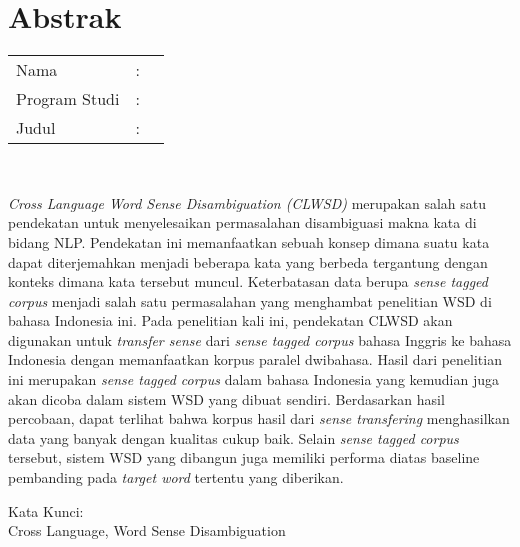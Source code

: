 %
%
%

\chapter*{Abstrak}

\vspace*{0.2cm}

\noindent \begin{tabular}{l l p{10cm}}
	Nama&: & \penulis \\
	Program Studi&: & \program \\
	Judul&: & \judul \\
\end{tabular} \\ 

\vspace*{0.5cm}

\noindent
\textit{Cross Language Word Sense Disambiguation (CLWSD)} merupakan salah satu pendekatan untuk menyelesaikan permasalahan disambiguasi makna kata di bidang NLP. Pendekatan ini memanfaatkan sebuah konsep dimana suatu kata dapat diterjemahkan menjadi beberapa kata yang berbeda tergantung dengan konteks dimana kata tersebut muncul. Keterbatasan data berupa \textit{sense tagged corpus} menjadi salah satu permasalahan yang menghambat penelitian WSD di bahasa Indonesia ini. Pada penelitian kali ini, pendekatan CLWSD akan digunakan untuk \textit{transfer sense} dari \textit{sense tagged corpus} bahasa Inggris ke bahasa Indonesia dengan memanfaatkan korpus paralel dwibahasa. Hasil dari penelitian ini merupakan \textit{sense tagged corpus} dalam bahasa Indonesia yang kemudian juga akan dicoba dalam sistem WSD yang dibuat sendiri. Berdasarkan hasil percobaan, dapat terlihat bahwa korpus hasil dari \textit{sense transfering} menghasilkan data yang banyak dengan kualitas cukup baik. Selain \textit{sense tagged corpus} tersebut, sistem WSD yang dibangun juga memiliki performa diatas baseline pembanding pada \textit{target word}  tertentu yang diberikan.


\vspace*{0.2cm}

\noindent Kata Kunci: \\ 
\noindent Cross Language, Word Sense Disambiguation

\newpage